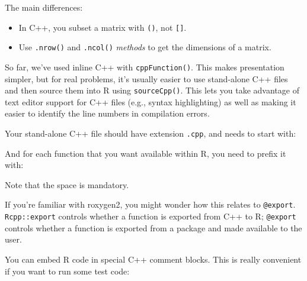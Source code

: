 The main differences:

\begin{itemize}
\item
  In C++, you subset a matrix with \texttt{()}, not \texttt{{[}{]}}.
\item
  Use \texttt{.nrow()} and \texttt{.ncol()} \emph{methods} to get the
  dimensions of a matrix.
\end{itemize}


So far, we've used inline C++ with \texttt{cppFunction()}. This makes
presentation simpler, but for real problems, it's usually easier to use
stand-alone C++ files and then source them into R using
\texttt{sourceCpp()}. This lets you take advantage of text editor
support for C++ files (e.g., syntax highlighting) as well as making it
easier to identify the line numbers in compilation errors.

Your stand-alone C++ file should have extension \texttt{.cpp}, and needs
to start with:

\begin{Shaded}
\begin{Highlighting}[]
  
\end{Highlighting}
\end{Shaded}

And for each function that you want available within R, you need to
prefix it with:

\begin{Shaded}
\begin{Highlighting}[]
\end{Highlighting}
\end{Shaded}

Note that the space is mandatory.

If you're familiar with roxygen2, you might wonder how this relates to
\texttt{@export}. \texttt{Rcpp::export} controls whether a function is
exported from C++ to R; \texttt{@export} controls whether a function is
exported from a package and made available to the user.

You can embed R code in special C++ comment blocks. This is really
convenient if you want to run some test code:

